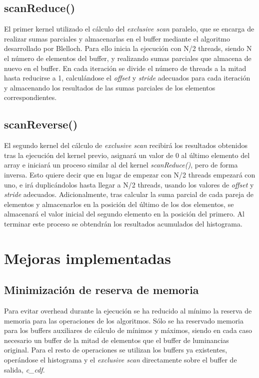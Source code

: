 \documentclass[10pt,oneside,a4paper]{article}
\begin{document}
\subsection{scanReduce()}
El primer kernel utilizado el cálculo del \textit{exclusive scan} paralelo, que se encarga de realizar sumas parciales y almacenarlas en el buffer mediante el algoritmo desarrollado por Blelloch. Para ello inicia la ejecución con N/2 threads, siendo N el número de elementos del buffer, y realizando sumas parciales que almacena de nuevo en el buffer. En cada iteración se divide el número de threads a la mitad hasta reducirse a 1, calculándose el \emph{offset} y \emph{stride} adecuados para cada iteración y almacenando los resultados de las sumas parciales de los elementos correspondientes. 

\subsection{scanReverse()}
El segundo kernel del cálculo de \textit{exclusive scan} recibirá los resultados obtenidos tras la ejecución del kernel previo, asignará un valor de 0 al último elemento del array e iniciará un proceso similar al del kernel \textit{scanReduce()}, pero de forma inversa. Esto quiere decir que en lugar de empezar con N/2 threads empezará con uno, e irá duplicándolos hasta llegar a N/2 threads, usando los valores de \emph{offset} y \emph{stride} adecuados. Adicionalmente, tras calcular la suma parcial de cada pareja de elementos y almacenarlos en la posición del último de los dos elementos, se almacenará el valor inicial del segundo elemento en la posición del primero. Al terminar este proceso se obtendrán los resultados acumulados del histograma.

\section{Mejoras implementadas}
\subsection{Minimización de reserva de memoria}
Para evitar overhead durante la ejecución se ha reducido al mínimo la reserva de memoria para las operaciones de los algoritmos. Sólo se ha reservado memoria para los buffers auxiliares de cálculo de mínimos y máximos, siendo en cada caso necesario un buffer de la mitad de elementos que el buffer de luminancias original. Para el resto de operaciones se utilizan los buffers ya existentes, operándose el histograma y el \emph{exclusive scan} directamente sobre el buffer de salida, \emph{c\_cdf}.
\end{document}
